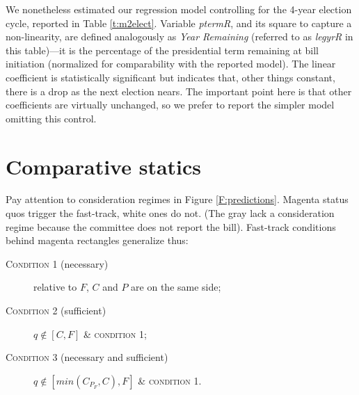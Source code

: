 \documentclass[letter,12pt]{article}
\begin{document}
We nonetheless estimated our regression model controlling for the 4-year election cycle, reported in Table \ref{t:m2elect}. Variable \emph{ptermR}, and its square to capture a non-linearity, are defined analogously as \emph{Year Remaining} (referred to as \emph{legyrR} in this table)---it is the percentage of the presidential term remaining at bill initiation (normalized for comparability with the reported model). The linear coefficient is statistically significant but indicates that, other things constant, there is a drop as the next election nears. The important point here is that other coefficients are virtually unchanged, so we prefer to report the simpler model omitting this control. 

\section{Comparative statics}

Pay attention to consideration regimes in Figure \ref{F:predictions}. Magenta status quos trigger the fast-track, white ones do not. (The gray lack a consideration regime because the committee does not report the bill). Fast-track conditions behind magenta rectangles generalize thus:  

\begin{description}
\item[\textsc{Condition 1} (necessary)] relative to $F$, $C$ and $P$ are on the same side; 
\item[\textsc{Condition 2} (sufficient)]  $q \notin [C,F]$ \& \textsc{condition 1};
\item[\textsc{Condition 3} (necessary and sufficient)] $q \notin [min(C_{P_F},C),F]$ \& \textsc{condition 1}.
\end{description}


\end{document}
